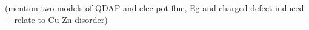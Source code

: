 (mention two models of QDAP and elec pot fluc, Eg and charged defect induced + relate to Cu-Zn disorder)\\













